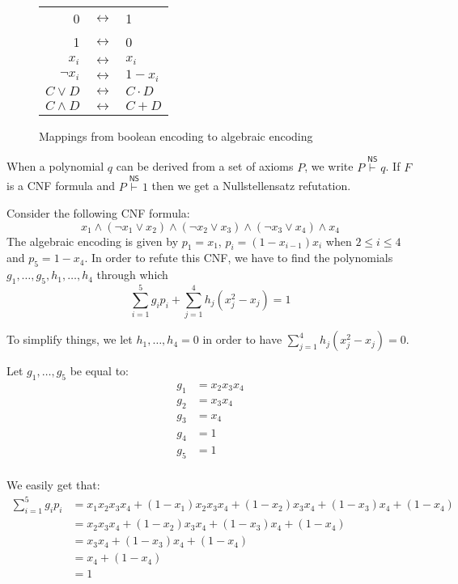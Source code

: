 \begin{figure}[H]
    \centering
    \begin{tabular}{r c l}
        0 & $\longleftrightarrow$ & 1 \\
        1 & $\longleftrightarrow$ & 0 \\
        $x_i$ & $\longleftrightarrow$ & $x_i$ \\
        $\lnot x_i$ & $\longleftrightarrow$ & $1-x_i$ \\
        $C \lor D$ & $\longleftrightarrow$ & $C \cdot D$ \\
        $C \land D$ & $\longleftrightarrow$ & $C + D$ \\
    \end{tabular}

    \caption{Mappings from boolean encoding to algebraic encoding}
\end{figure}

When a polynomial $q$ can be derived from a set of axioms $P$, we write $P \stackrel{\mathsf{NS}}{\vdash} q$. If $F$ is a CNF formula and $P \stackrel{\mathsf{NS}}{\vdash} 1$ then we get a Nullstellensatz refutation.

Consider the following CNF formula:
\[x_1 \land (\lnot x_1 \lor x_2) \land (\lnot x_2 \lor x_3) \land (\lnot x_3 \lor x_4)\land x_4\]
The algebraic encoding is given by $p_1 = x_1$, $p_i = (1-x_{i-1})x_i$ when $2 \leq i \leq 4$ and $p_5 = 1-x_4$. In order to refute this CNF, we have to find the polynomials $g_1, \ldots, g_5, h_1, \ldots, h_4$ through which
\[\sum_{i = 1}^5 g_ip_{i} + \sum_{j = 1}^4 h_j(x_j^2-x_j) = 1\]

To simplify things, we let $h_1, \ldots, h_4 = 0$ in order to have $\sum_{j = 1}^4 h_j(x_j^2-x_j) = 0$.

Let $g_1, \ldots, g_5$ be equal to:
\[\begin{split}
    g_1 &= x_2x_3x_4 \\
    g_2 &= x_3x_4 \\
    g_3 &= x_4 \\
    g_4 &= 1 \\
    g_5 &= 1 \\
\end{split}\]

We easily get that:
\[\begin{split}
    \sum_{i = 1}^5 g_ip_{i}&= x_1x_2x_3x_4 + (1-x_1)x_2x_3x_4 + (1-x_2)x_3x_4  + (1-x_3)x_4 + (1-x_4)\\
    &= x_2x_3x_4 + (1-x_2)x_3x_4  + (1-x_3)x_4 + (1-x_4)\\
    &= x_3x_4  + (1-x_3)x_4 + (1-x_4)\\
    &= x_4 + (1-x_4)\\
    &= 1\\
\end{split}\]

